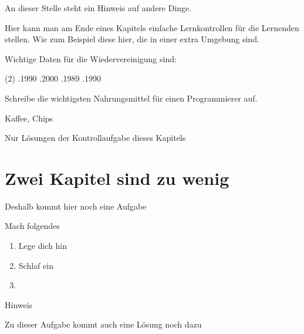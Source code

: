 \documentclass[12pt,a4paper,parskip=half,chapterprefix,bibliography=totoc,footheight=57pt,numbers=noendperiod]{scrreprt}
\begin{document}
        \begin{hinweisBox}
            An dieser Stelle steht ein Hinweis auf andere Dinge.
        \end{hinweisBox}

    \begin{lernkontrolleBox}
        Hier kann man am Ende eines Kapitels einfache Lernkontrollen für die Lernenden stellen. Wie zum Beispiel diese hier, die in einer extra Umgebung sind.

        \begin{kontrollaufgabe}
            Wichtige Daten für die Wiedervereinigung sind:
            \begin{mcumgebung}(2)
                .1990
                .2000
                .1989
                .1990
            \end{mcumgebung}
        \end{kontrollaufgabe}
        \begin{kontrollloesung}
            \mcloesung
        \end{kontrollloesung}

        \begin{kontrollaufgabe}
            Schreibe die wichtigsten Nahrungsmittel für einen Programmierer auf.
        \end{kontrollaufgabe}
        \begin{kontrollloesung}
            Kaffee, Chips
        \end{kontrollloesung}
    \end{lernkontrolleBox}

    \newpage
    \begin{loesungenBox}
        Nur Lösungen der Kontrollaufgabe dieses Kapitels
    \end{loesungenBox}


\chapter{Zwei Kapitel sind zu wenig}
    Deshalb kommt hier noch eine Aufgabe
    \begin{aufgabe} Mach folgendes
        \begin{enumerate}
            \item Lege dich hin
            \item Schlaf ein
            \item
        \end{enumerate}
        \TextFeld{3cm}
    \end{aufgabe}
    \begin{bearbeitungshinweis}
        Hinweis
    \end{bearbeitungshinweis}
    \begin{loesung}
        Zu dieser Aufgabe kommt auch eine Lösung noch dazu
    \end{loesung}
\end{document}

